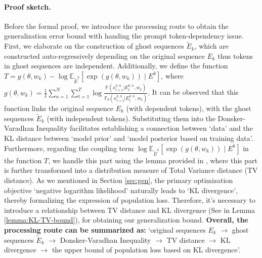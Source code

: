\paragraph{Proof sketch.} Before the formal proof, we introduce the processing route to obtain the generalization error bound with handing the prompt token-dependency issue. First, we elaborate on the construction of ghost sequences $\tilde{E}_k$, which are constructed auto-regressively depending on the original sequence ${E}_k$ thus tokens in ghost sequences are independent. Additionally, we define the function $T=g(\theta,w_k)-\log \mathbb{E}_{\tilde{E}^k}\left[\exp(g(\theta,w_k))\mid E^k\right]$, where
$
g(\theta,w_k)=\frac{1}{2}\sum_{n=1}^{N} \sum_{t=1}^T \log \frac{\mathbb{P}(x^{k,n}_{t+1}|E^{k,n}_t, w_k)}{\mathbb{P}_\theta(x^{k,n}_{t+1}|E^{k,n}_t, w_k)}.
$
It can be observed that this function links the original sequence $E_k$ (with dependent tokens), with the ghost sequences $\tilde{E}_k$ (with independent tokens). Substituting them into the Donsker-Varadhan Inequality facilitates establishing a connection between `data’ and the KL distance between `model prior’ and `model posterior based on training data’. Furthermore, regarding the coupling term $\log \mathbb{E}_{\tilde{E}^k}\left[\exp(g(\theta,w_k))\mid E^k\right]$ in the function $T$, we handle this part using the lemma provided in \cite{agarwal2020flambe}, where this part is further transformed into a distribution measure of Total Variance distance (TV distance). As we mentioned in Section \ref{sec:gen}, the primary optimization objective `negative logarithm likelihood’ naturally leads to `KL divergence’, thereby formalizing the expression of population loss. Therefore, it's necessary to introduce a relationship between TV distance and KL divergence (See in Lemma \ref{lemma:KL-TV-bound}), for obtaining our generalization bound. \textbf{Overall, the processing route can be summarized as:}
`original sequences $E_k$ $\rightarrow$ ghost sequences $\tilde{E}_k$ $\rightarrow$ Donsker-Varadhan Inequality $\rightarrow$ TV distance $\rightarrow$ KL divergence $\rightarrow$ the upper bound of population loss based on KL divergence’.

